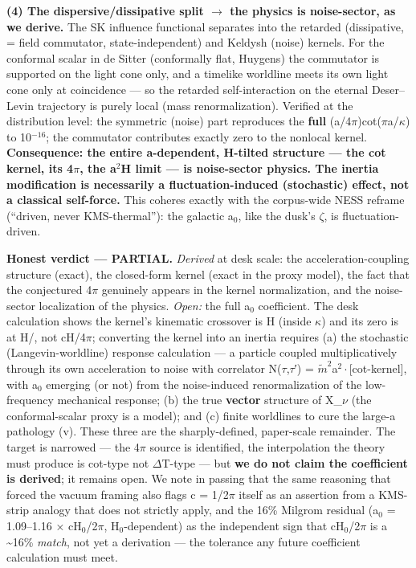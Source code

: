 \documentclass[aps,prd,preprint,nofootinbib,superscriptaddress]{revtex4-2}
\begin{document}
\textbf{(4) The dispersive/dissipative split \(\to\) the physics is
noise-sector, as we derive.} The SK influence functional separates into
the retarded (dissipative, = field commutator, state-independent) and
Keldysh (noise) kernels. For the conformal scalar in de Sitter
(conformally flat, Huygens) the commutator is supported on the light
cone only, and a timelike worldline meets its own light cone only at
coincidence --- so the retarded self-interaction on the eternal
Deser--Levin trajectory is purely local (mass renormalization). Verified
at the distribution level: the symmetric (noise) part reproduces the
\textbf{full} (a/4\(\pi\))cot(\(\pi\)a/\(\kappa\)) to 10\(^{-16}\); the
commutator contributes exactly zero to the nonlocal kernel.
\textbf{Consequence: the entire a-dependent, H-tilted structure --- the
cot kernel, its 4\(\pi\), the a\(^{2}\)H limit --- is noise-sector
physics. The inertia modification is necessarily a fluctuation-induced
(stochastic) effect, not a classical self-force.} This coheres exactly
with the corpus-wide NESS reframe (``driven, never KMS-thermal''): the
galactic a\(_{0}\), like the dusk's \(\zeta\), is fluctuation-driven.

\textbf{Honest verdict --- PARTIAL.} \emph{Derived} at desk scale: the
acceleration-coupling structure (exact), the closed-form kernel (exact
in the proxy model), the fact that the conjectured 4\(\pi\) genuinely
appears in the kernel normalization, and the noise-sector localization
of the physics. \emph{Open:} the full a\(_{0}\) coefficient. The desk
calculation shows the kernel's kinematic crossover is H (inside
\(\kappa\)) and its zero is at H/, not cH/4\(\pi\); converting
the kernel into an inertia requires (a) the stochastic
(Langevin-worldline) response calculation --- a particle coupled
multiplicatively through its own acceleration to noise with correlator
N(\(\tau\),\(\tau\)′) = \(\tilde{m}^{2}\)a\(^{2}\cdot\){[}cot-kernel{]},
with a\(_{0}\) emerging (or not) from the noise-induced renormalization
of the low-frequency mechanical response; (b) the true \textbf{vector}
structure of X\_\(\nu\) (the conformal-scalar proxy is a model); and (c)
finite worldlines to cure the large-a pathology (v). These three are the
sharply-defined, paper-scale remainder. The target is narrowed --- the
4\(\pi\) source is identified, the interpolation the theory must produce
is cot-type not \(\Delta\)T-type --- but \textbf{we do not claim the
coefficient is derived}; it remains open. We note in passing that the
same reasoning that forced the vacuum framing also flags c = 1/2\(\pi\)
itself as an assertion from a KMS-strip analogy that does not strictly
apply, and the 16\% Milgrom residual (a\(_{0}\) = 1.09--1.16 ×
cH\(_{0}\)/2\(\pi\), H\(_{0}\)-dependent) as the independent sign that
cH\(_{0}\)/2\(\pi\) is a \textasciitilde16\% \emph{match}, not yet a
derivation --- the tolerance any future coefficient calculation must
meet.
\end{document}
